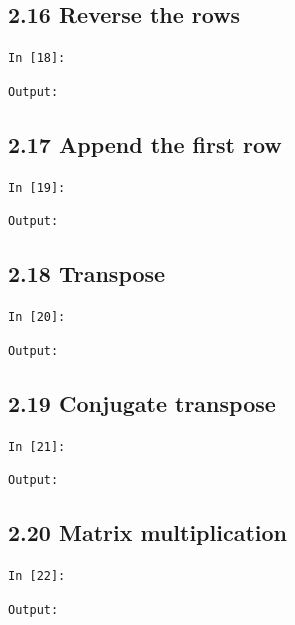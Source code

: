 \documentclass[11pt]{article}
\begin{document}
\par\medskip\noindent\begin{minipage}{\linewidth}
\subsection*{2.16 Reverse the rows}
\noindent\texttt{In [18]:}

\noindent\texttt{Output:}

\end{minipage}\par

\par\medskip\noindent\begin{minipage}{\linewidth}
\subsection*{2.17 Append the first row}
\noindent\texttt{In [19]:}

\noindent\texttt{Output:}

\end{minipage}\par

\par\medskip\noindent\begin{minipage}{\linewidth}
\subsection*{2.18 Transpose}
\noindent\texttt{In [20]:}

\noindent\texttt{Output:}

\end{minipage}\par

\par\medskip\noindent\begin{minipage}{\linewidth}
\subsection*{2.19 Conjugate transpose}
\noindent\texttt{In [21]:}

\noindent\texttt{Output:}

\end{minipage}\par

\par\medskip\noindent\begin{minipage}{\linewidth}
\subsection*{2.20 Matrix multiplication}
\noindent\texttt{In [22]:}

\noindent\texttt{Output:}

\end{minipage}\par
\end{document}
